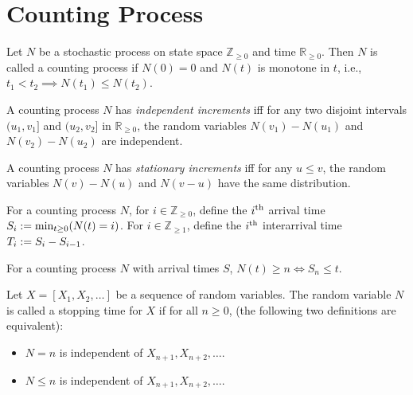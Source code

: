 \documentclass[a4paper, 12pt, fleqn]{article}
\begin{document}
\section{Counting Process}

\begin{definition}
Let $N$ be a stochastic process on state space $\mathbb{Z}_{\ge 0}$ and time $\mathbb{R}_{\ge 0}$.
Then $N$ is called a counting process if $N(0) = 0$ and $N(t)$ is monotone in $t$,
i.e., $t_1 < t_2 \implies N(t_1) \le N(t_2)$.
\end{definition}

\begin{definition}
A counting process $N$ has \emph{independent increments} iff
for any two disjoint intervals $(u_1, v_1]$ and $(u_2, v_2]$ in $\mathbb{R}_{\ge 0}$,
the random variables $N(v_1) - N(u_1)$ and $N(v_2) - N(u_2)$ are independent.
\end{definition}

\begin{definition}
A counting process $N$ has \emph{stationary increments} iff for any $u \le v$,
the random variables $N(v) - N(u)$ and $N(v-u)$ have the same distribution.
\end{definition}

\begin{definition}
For a counting process $N$, for $i \in \mathbb{Z}_{\ge 0}$,
define the $i^{\textrm{th}}$ arrival time $S_i := \min_{t \ge 0} (N(t) = i)$.
For $i \in \mathbb{Z}_{\ge 1}$, define the $i^{\textrm{th}}$ interarrival time $T_i := S_i - S_{i-1}$.
\end{definition}

\begin{lemma}
For a counting process $N$ with arrival times $S$, $N(t) \ge n \iff S_n \le t$.
\end{lemma}

\begin{definition}
\label{defn:stopping-time}
Let $X = [X_1, X_2, \ldots]$ be a sequence of random variables.
The random variable $N$ is called a stopping time for $X$ if for all $n \ge 0$,
(the following two definitions are equivalent):
\begin{itemize}
\item $N = n$ is independent of $X_{n+1}, X_{n+2}, \ldots$.
\item $N \le n$ is independent of $X_{n+1}, X_{n+2}, \ldots$.
\end{itemize}
\end{definition}
\end{document}
